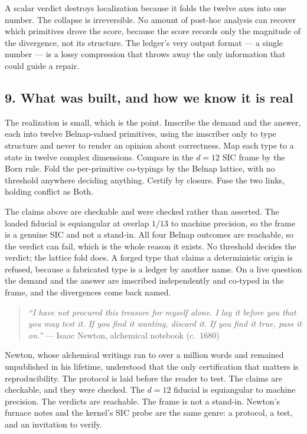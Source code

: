 A scalar verdict destroys localization because it folds the twelve axes
into one number. The collapse is irreversible. No amount of post-hoc
analysis can recover which primitives drove the score, because the score
records only the magnitude of the divergence, not its structure. The
ledger's very output format --- a single number --- is a lossy
compression that throws away the only information that could guide a
repair.

\hypertarget{what-was-built-and-how-we-know-it-is-real}{%
\subsection{9. What was built, and how we know it is
real}\label{what-was-built-and-how-we-know-it-is-real}}

The realization is small, which is the point. Imscribe the demand and
the answer, each into twelve Belnap-valued primitives, using the
imscriber only to type structure and never to render an opinion about
correctness. Map each type to a state in twelve complex dimensions.
Compare in the \({d=12}\) SIC frame by the Born rule. Fold the
per-primitive co-typings by the Belnap lattice, with no threshold
anywhere deciding anything. Certify by closure. Fuse the two links,
holding conflict as Both.

The claims above are checkable and were checked rather than asserted.
The loaded fiducial is equiangular at overlap \({1/13}\) to machine
precision, so the frame is a genuine SIC and not a stand-in. All four
Belnap outcomes are reachable, so the verdict can fail, which is the
whole reason it exists. No threshold decides the verdict; the lattice
fold does. A forged type that claims a deterministic origin is refused,
because a fabricated type is a ledger by another name. On a live
question the demand and the answer are imscribed independently and
co-typed in the frame, and the divergences come back named.

\begin{quote}
\emph{``I have not procured this treasure for myself alone. I lay it
before you that you may test it. If you find it wanting, discard it. If
you find it true, pass it on.''} --- Isaac Newton, alchemical notebook
(c.~1680)
\end{quote}

Newton, whose alchemical writings ran to over a million words and
remained unpublished in his lifetime, understood that the only
certification that matters is reproducibility. The protocol is laid
before the reader to test. The claims are checkable, and they were
checked. The \({d=12}\) fiducial is equiangular to machine precision.
The verdicts are reachable. The frame is not a stand-in. Newton's
furnace notes and the kernel's SIC probe are the same genre: a protocol,
a test, and an invitation to verify.

